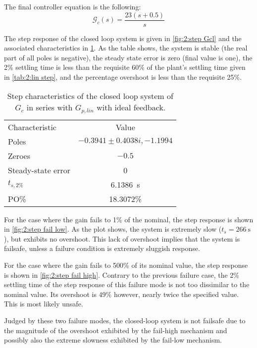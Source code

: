 The final controller equation is the following:
\begin{equation}
	\label{eq:2:Gc}
	\mathcal{G}_c(s) = \frac{23(s+0.5)}{s}
\end{equation}

The step response of the closed loop system is given in \cref{fig:2:step Gcl} and the associated characteristics in \cref{tab:2:step Gcl}. As the table shows, the system is stable (the real part of all poles is negative), the steady state error is zero (final value is one), the 2\% settling time is less than the requisite 60\% of the plant's settling time given in \cref{tab:2:lin step}, and the percentage overshoot is less than the requisite 25\%.

\begin{table}[h]
	\centering
	\begin{tabular}{lc}
		\toprule
		Characteristic&Value\\
		\cmidrule(r){1-1}\cmidrule(l){2-2}
		Poles&$-0.3941\pm\num{0.4038i},-1.1994$\\
		Zeroes&$-0.5$\\
		Steady-state error&0\\
		$t_{s,2\%}$&\SI{6.1386}{\second}\\
		PO\%&18.3072\%\\
		\bottomrule
	\end{tabular}
	\caption{Step characteristics of the closed loop system of $G_c$ in series with $G_{p,lin}$ with ideal feedback.}
	\label{tab:2:step Gcl}
\end{table}


For the case where the gain fails to 1\% of the nominal, the step response is shown in \cref{fig:2:step fail low}. As the plot shows, the system is extremely slow ($t_s=\SI{266}{\second}$), but exhibits no overshoot. This lack of overshoot implies that the system is failsafe, unless a failure condition is extremely sluggish response.

For the case where the gain fails to 500\% of its nominal value, the step response is shown in \cref{fig:2:step fail high}. Contrary to the previous failure case, the 2\% settling time of the step response of this failure mode is not too dissimilar to the nominal value. Its overshoot is 49\% however, nearly twice the specified value. This is most likely unsafe.

Judged by these two failure modes, the closed-loop system is not failsafe due to the magnitude of the overshoot exhibited by the fail-high mechanism and possibly also the extreme slowness exhibited by the fail-low mechanism.

